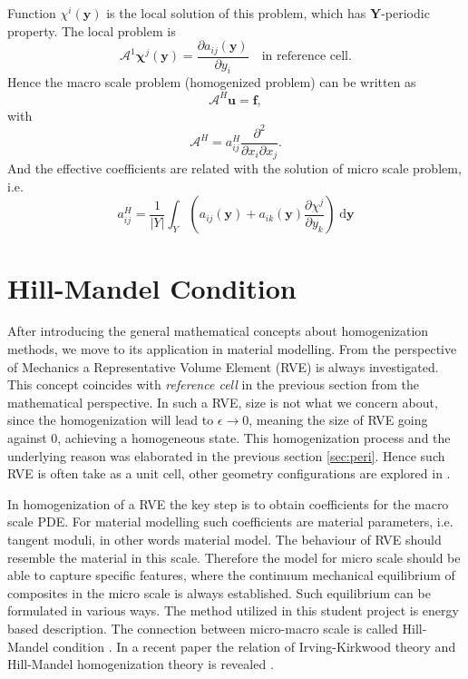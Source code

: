 \documentclass[10pt,a4paper]{scrreprt}
\newcommand{\myd}{\;\mathrm{d}}
\begin{document}
Function $\chi^{i}(\mathbf{y})$ is the local solution of this problem, which has $\mathbf{Y}$-periodic property. The local problem is
\begin{equation}
\mathcal{A}^{1} \mathbf{\chi}^{j}(\mathbf{y}) = \dfrac{\partial a_{ij}(\mathbf{y})}{\partial y_{i}} \quad \text{in reference cell}.
\end{equation}
Hence the macro scale problem (homogenized problem) can be written as
\begin{equation}
\mathcal{A}^{H} \mathbf{u} = \mathbf{f},
\end{equation}
with
\begin{equation}
\mathcal{A}^{H} = a^{H}_{ij} \dfrac{\partial^{2}}{\partial x_{i} \partial x_{j}}.
\end{equation}
%
And the effective coefficients are related with the solution of micro scale problem, i.e.
\begin{equation}
a^{H}_{ij} = \dfrac{1}{|Y|} \int_{Y} \left( a_{ij}(\mathbf{y}) + a_{ik}(\mathbf{y}) \dfrac{\partial \chi^{j}}{\partial y_{k}} \right) \myd{\mathbf{y}}
\end{equation}

\section{Hill-Mandel Condition}
After introducing the general mathematical concepts about homogenization methods, we move to its application in material modelling. From the perspective of Mechanics a Representative Volume Element (RVE) is always investigated. This concept coincides with \textit{reference cell} in the previous section from the mathematical perspective. In such a RVE, size is not what we concern about, since the homogenization will lead to $\epsilon \to 0$, meaning the size of RVE going against 0, achieving a homogeneous state. This homogenization process and the underlying reason was elaborated in the previous section \ref{sec:peri}. Hence such RVE is often take as a unit cell, other geometry configurations are explored in \citep{gluge2012comparison}. 

In homogenization of a RVE the key step is to obtain coefficients for the macro scale PDE. For material modelling such coefficients are material parameters, i.e. tangent moduli, in other words material model. The behaviour of RVE should resemble the material in this scale. Therefore the model for micro scale should be able to capture specific features, where the continuum mechanical equilibrium of composites in the micro scale is always established. Such equilibrium can be formulated in various ways. The method utilized in this student project is energy based description. The connection between micro-macro scale is called Hill-Mandel condition \citep{hill_essential_1967}. In a recent paper the relation of Irving-Kirkwood theory and Hill-Mandel homogenization theory is revealed \citep{mercer_novel_2015}.
\end{document}

